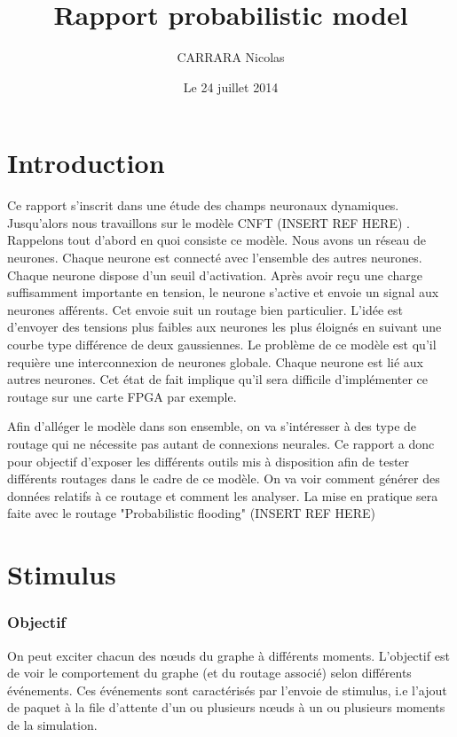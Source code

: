 \documentclass{report}
\begin{document}
\title{Rapport probabilistic model}
\author{CARRARA Nicolas}
\date{Le 24 juillet 2014}
\tableofcontents



\part{Introduction}

Ce rapport s'inscrit dans une étude des champs neuronaux dynamiques. Jusqu'alors nous travaillons sur le modèle CNFT (INSERT REF HERE) . Rappelons tout d'abord en quoi consiste ce modèle. Nous avons un réseau de neurones. Chaque neurone est connecté avec l'ensemble des autres neurones. Chaque neurone dispose d'un seuil d'activation. Après avoir reçu une charge suffisamment importante en tension, le neurone s'active et envoie un signal aux neurones afférents. Cet envoie suit un routage bien particulier. L'idée est d'envoyer des tensions plus faibles aux neurones les plus éloignés en suivant une courbe type différence de deux gaussiennes. Le problème de ce modèle est qu'il requière une interconnexion de neurones globale. Chaque neurone est lié aux autres neurones. Cet état de fait implique qu'il sera difficile d'implémenter ce routage sur une carte FPGA par exemple. 

Afin d'alléger le modèle dans son ensemble, on va s'intéresser à des type de routage qui ne nécessite pas autant de connexions neurales. Ce rapport a donc pour objectif d'exposer les différents outils mis à disposition afin de tester différents routages dans le cadre de ce modèle. On va voir comment générer des données relatifs à ce routage et comment les analyser. La mise en pratique sera faite avec le routage "Probabilistic flooding" (INSERT REF HERE)



\part{Stimulus}

\section{Objectif}

On peut exciter chacun des nœuds du graphe à différents moments. L'objectif est de voir le comportement du graphe (et du routage associé) selon différents événements. Ces événements sont caractérisés par l'envoie de stimulus, i.e l'ajout de paquet à la file d'attente d'un ou plusieurs nœuds à un ou plusieurs moments de la simulation.
\end{document}
